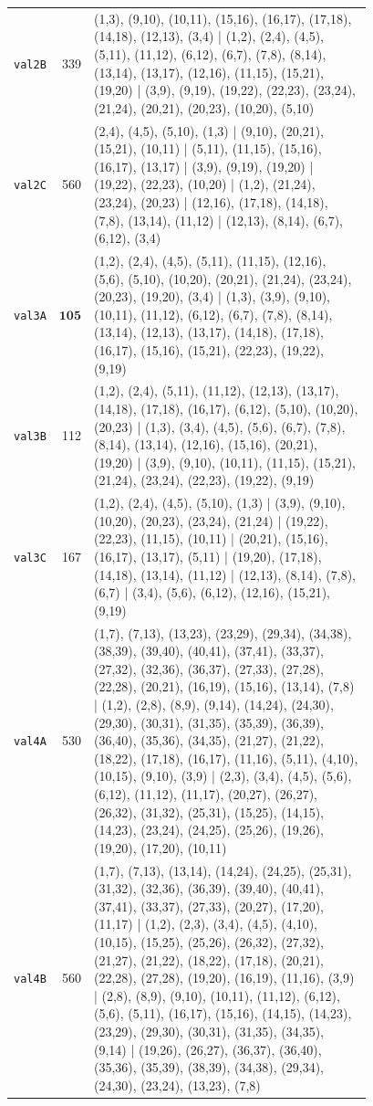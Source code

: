 \begin{landscape}
\begin{longtable}{lr>{\tiny\raggedright\arraybackslash}p{0.78\linewidth}}
\texttt{val2B} & 339 & (1,3), (9,10), (10,11), (15,16), (16,17), (17,18), (14,18), (12,13), (3,4) | (1,2), (2,4), (4,5), (5,11), (11,12), (6,12), (6,7), (7,8), (8,14), (13,14), (13,17), (12,16), (11,15), (15,21), (19,20) | (3,9), (9,19), (19,22), (22,23), (23,24), (21,24), (20,21), (20,23), (10,20), (5,10) \\[2pt]
\texttt{val2C} & 560 & (2,4), (4,5), (5,10), (1,3) | (9,10), (20,21), (15,21), (10,11) | (5,11), (11,15), (15,16), (16,17), (13,17) | (3,9), (9,19), (19,20) | (19,22), (22,23), (10,20) | (1,2), (21,24), (23,24), (20,23) | (12,16), (17,18), (14,18), (7,8), (13,14), (11,12) | (12,13), (8,14), (6,7), (6,12), (3,4) \\[2pt]
\texttt{val3A} & $\mathbf{105}$ & (1,2), (2,4), (4,5), (5,11), (11,15), (12,16), (5,6), (5,10), (10,20), (20,21), (21,24), (23,24), (20,23), (19,20), (3,4) | (1,3), (3,9), (9,10), (10,11), (11,12), (6,12), (6,7), (7,8), (8,14), (13,14), (12,13), (13,17), (14,18), (17,18), (16,17), (15,16), (15,21), (22,23), (19,22), (9,19) \\[2pt]
\texttt{val3B} & 112 & (1,2), (2,4), (5,11), (11,12), (12,13), (13,17), (14,18), (17,18), (16,17), (6,12), (5,10), (10,20), (20,23) | (1,3), (3,4), (4,5), (5,6), (6,7), (7,8), (8,14), (13,14), (12,16), (15,16), (20,21), (19,20) | (3,9), (9,10), (10,11), (11,15), (15,21), (21,24), (23,24), (22,23), (19,22), (9,19) \\[2pt]
\texttt{val3C} & 167 & (1,2), (2,4), (4,5), (5,10), (1,3) | (3,9), (9,10), (10,20), (20,23), (23,24), (21,24) | (19,22), (22,23), (11,15), (10,11) | (20,21), (15,16), (16,17), (13,17), (5,11) | (19,20), (17,18), (14,18), (13,14), (11,12) | (12,13), (8,14), (7,8), (6,7) | (3,4), (5,6), (6,12), (12,16), (15,21), (9,19) \\[2pt]
\texttt{val4A} & 530 & (1,7), (7,13), (13,23), (23,29), (29,34), (34,38), (38,39), (39,40), (40,41), (37,41), (33,37), (27,32), (32,36), (36,37), (27,33), (27,28), (22,28), (20,21), (16,19), (15,16), (13,14), (7,8) | (1,2), (2,8), (8,9), (9,14), (14,24), (24,30), (29,30), (30,31), (31,35), (35,39), (36,39), (36,40), (35,36), (34,35), (21,27), (21,22), (18,22), (17,18), (16,17), (11,16), (5,11), (4,10), (10,15), (9,10), (3,9) | (2,3), (3,4), (4,5), (5,6), (6,12), (11,12), (11,17), (20,27), (26,27), (26,32), (31,32), (25,31), (15,25), (14,15), (14,23), (23,24), (24,25), (25,26), (19,26), (19,20), (17,20), (10,11) \\[2pt]
\texttt{val4B} & 560 & (1,7), (7,13), (13,14), (14,24), (24,25), (25,31), (31,32), (32,36), (36,39), (39,40), (40,41), (37,41), (33,37), (27,33), (20,27), (17,20), (11,17) | (1,2), (2,3), (3,4), (4,5), (4,10), (10,15), (15,25), (25,26), (26,32), (27,32), (21,27), (21,22), (18,22), (17,18), (20,21), (22,28), (27,28), (19,20), (16,19), (11,16), (3,9) | (2,8), (8,9), (9,10), (10,11), (11,12), (6,12), (5,6), (5,11), (16,17), (15,16), (14,15), (14,23), (23,29), (29,30), (30,31), (31,35), (34,35), (9,14) | (19,26), (26,27), (36,37), (36,40), (35,36), (35,39), (38,39), (34,38), (29,34), (24,30), (23,24), (13,23), (7,8) \\[2pt]

\end{longtable}
\end{landscape}
